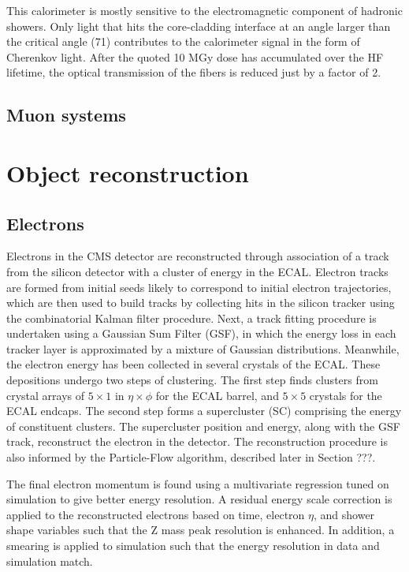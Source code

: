 This calorimeter is mostly sensitive to the electromagnetic component of hadronic showers.
Only light that hits the core-cladding interface at an angle larger than the critical angle (71\textdegree) contributes to the calorimeter signal in the form of Cherenkov light. 
After the quoted 10 MGy dose has accumulated over the HF lifetime, the optical transmission of the fibers is reduced just by a factor of 2.

\subsection{Muon systems}
\section{Object reconstruction}
\subsection{Electrons}
Electrons in the CMS detector are reconstructed through association of a track from the silicon detector with a cluster of energy in the ECAL.
Electron tracks are formed from initial seeds likely to correspond to initial electron trajectories, which are then used to build tracks by collecting hits in the silicon tracker using the combinatorial Kalman filter procedure.
Next, a track fitting procedure is undertaken using a Gaussian Sum Filter (GSF), in which the energy loss in each tracker layer is approximated by a mixture of Gaussian distributions.
Meanwhile, the electron energy has been collected in several crystals of the ECAL. 
These depositions undergo two steps of clustering.
The first step finds clusters from crystal arrays of $5 \times 1$ in $\eta \times \phi$ for the ECAL barrel, and $5 \times 5$ crystals for the ECAL endcaps.
The second step forms a supercluster (SC) comprising the energy of constituent clusters.
The supercluster position and energy, along with the GSF track, reconstruct the electron in the detector.\cite{ElectronReco2015}
The reconstruction procedure is also informed by the Particle-Flow algorithm, described later in Section ???.

The final electron momentum is found using a multivariate regression tuned on simulation to give better energy resolution.
A residual energy scale correction is applied to the reconstructed electrons based on time, electron $\eta$, and shower shape variables
such that the Z mass peak resolution is enhanced.  In addition, a smearing is applied to simulation such that the energy resolution in data and simulation match.

